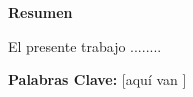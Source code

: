 \begin{center}
{\Large{\bf{Resumen}}}
\end{center}


El presente trabajo ........

\vspace{4cm} %
\textbf{Palabras Clave:} [aquí van ]

\clearpage
